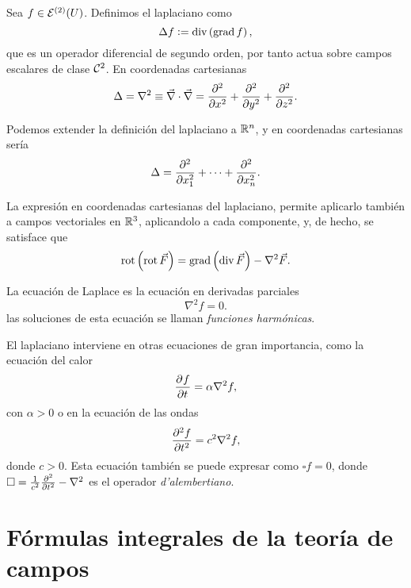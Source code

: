 \begin{defi}
    Sea $f \in \Es^{(2)}(U)$. Definimos el laplaciano como
    \[
        \Delta f := \diver \left( \grad f \right),
    \]
    que es un operador diferencial de segundo orden, por tanto actua sobre campos escalares de clase $\C^2$. En
    coordenadas cartesianas
    \[
        \Delta = \nabla^2 \equiv \vec{\nabla} \cdot \vec{\nabla} = \pdv[2]{}{x} + \pdv[2]{}{y} + \pdv[2]{}{z}.
    \]
\end{defi}

\begin{obs*}
    Podemos extender la definición del laplaciano a $\real^n$, y en coordenadas cartesianas sería
    \[
        \Delta = \pdv[2]{}{x_1} + \cdots + \pdv[2]{}{x_n}.
    \]
\end{obs*}

\begin{obs}
    La expresión en coordenadas cartesianas del laplaciano, permite aplicarlo también a campos vectoriales en
    $\real^3$, aplicandolo a cada componente, y, de hecho, se satisface que
    \[
        \rot \left( \rot \vec{F} \right) = \grad \left( \diver \vec{F} \right) - \nabla^2\vec{F}.
    \]
\end{obs}

\begin{obs}
    La ecuación de Laplace es la ecuación en derivadas parciales
    \[
        \nabla^2 f = 0.
    \]
    las soluciones de esta ecuación se llaman \emph{funciones harmónicas}.
\end{obs}
\begin{obs}
    El laplaciano interviene en otras ecuaciones de gran importancia, como la ecuación del calor
    \[
        \pdv{f}{t} = \alpha \nabla^2 f,
    \]
    con $\alpha > 0$ o en la ecuación de las ondas
    \[
        \pdv[2]{f}{t} = c^2 \nabla^2 f,
    \]
    donde $c > 0$. Esta ecuación tambi\'en se puede expresar como $\square f = 0$, donde $\square = \frac{1}{c^2} \pdv[2]{}{t} - \nabla^2$
    es el operador \emph{d'alembertiano}.
\end{obs}

\section{Fórmulas integrales de la teoría de campos}

